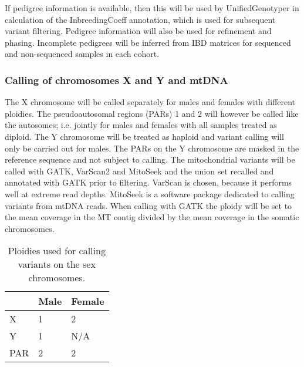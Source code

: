 If pedigree information is available, then this will be used by UnifiedGenotyper %
in calculation of the InbreedingCoeff annotation, which is used for subsequent variant filtering. Pedigree information will also be used for refinement and phasing. Incomplete pedigrees will be inferred from IBD matrices for sequenced and non-sequenced samples in each cohort.

%

\subsubsection{Calling of chromosomes X and Y and mtDNA}
The X chromosome will be called separately for males and females with different ploidies. The pseudoautosomal regions (PARs) 1 and 2 will however be called like the autosomes; i.e. jointly for males and females with all samples treated as diploid. The Y chromosome will be treated as haploid and variant calling will only be carried out for males. The PARs on the Y chromosome are masked in the reference sequence and not subject to calling. The mitochondrial variants will be called with GATK, VarScan2\cite{Koboldt2012} and MitoSeek and the union set recalled and annotated with GATK prior to filtering. VarScan is chosen, because it performs well at extreme read depths.\cite{Stead2013} MitoSeek is a software package dedicated to calling variants from mtDNA reads. When calling with GATK the ploidy will be set to the mean coverage in the MT contig divided by the mean coverage in the somatic chromosomes.

\begin{table}[h]
\centering
\begin{tabular}{l|l|l|}
\cline{2-3}
\rowcolor[HTML]{FFFFFF} 
                          & Male & Female \\ \hline
\multicolumn{1}{|l|}{X}   & 1    & 2      \\ \hline
\multicolumn{1}{|l|}{Y}   & 1    & N/A    \\ \hline
\multicolumn{1}{|l|}{PAR} & 2    & 2      \\ \hline 
\end{tabular}
\caption{Ploidies used for calling variants on the sex chromosomes.}
\label{table:XYcalling}
\end{table}


